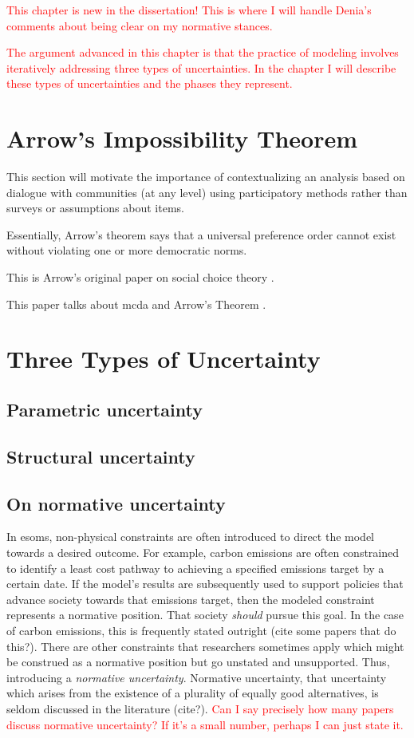 
\textcolor{red}{This chapter is new in the dissertation! This is where I will handle 
Denia's comments about being clear on my normative stances.}

\textcolor{red}{The argument advanced in this chapter is that the practice of modeling
involves iteratively addressing three types of uncertainties. In the chapter I will
describe these types of uncertainties and the phases they represent.}

\section{Arrow's Impossibility Theorem}

This section will motivate the importance of contextualizing an analysis based on 
dialogue with communities (at any level) using participatory methods rather than
surveys or assumptions about items.

Essentially, Arrow's theorem says that a universal preference order cannot exist without
violating one or more democratic norms.

This is Arrow's original paper on social choice theory \cite{arrow_difficulty_1950}.

This paper talks about \ac{mcda} and Arrow's Theorem \cite{franssen_arrows_2005}.

\section{Three Types of Uncertainty}

\subsection{Parametric uncertainty}

\subsection{Structural uncertainty}

\subsection{On normative uncertainty}
In \acp{esom}, non-physical constraints are often introduced to direct the model
towards a desired outcome. For example, carbon emissions are often constrained
to identify a least cost pathway to achieving a specified emissions target by a
certain date. If the model's results are subsequently used to support policies
that advance society towards that emissions target, then the modeled constraint
represents a normative position. That society \textit{should} pursue this goal.
In the case of carbon emissions, this is frequently stated outright (cite some
papers that do this?). There are other constraints that researchers sometimes
apply which might be construed as a normative position but go unstated and
unsupported. Thus, introducing a \textit{normative uncertainty}. Normative
uncertainty, that uncertainty which arises from the existence of a plurality of
equally good alternatives, is seldom discussed in the literature (cite?).
\textcolor{red}{Can I say precisely how many papers discuss normative
uncertainty? If it's a small number, perhaps I can just state it.}

